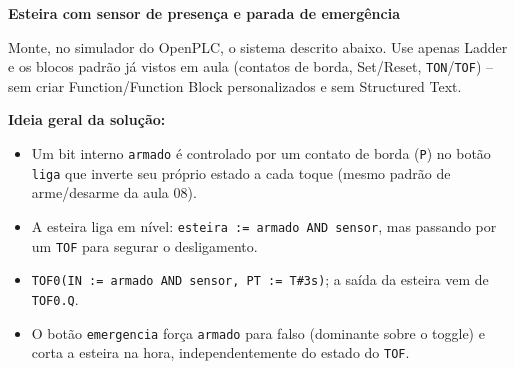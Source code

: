 \question[20] \textbf{Esteira com sensor de presença e parada de emergência}

Monte, no simulador do OpenPLC, o sistema descrito abaixo. Use apenas Ladder e os blocos padrão já vistos em aula (contatos de borda, Set/Reset, \texttt{TON}/\texttt{TOF}) -- sem criar Function/Function Block personalizados e sem Structured Text.


\begin{solution}
\textbf{Ideia geral da solução:}
\begin{itemize}
  \item Um bit interno \texttt{armado} é controlado por um contato de borda (\texttt{P}) no botão \texttt{liga} que inverte seu próprio estado a cada toque (mesmo padrão de arme/desarme da aula 08).
  \item A esteira liga em nível: \texttt{esteira := armado AND sensor}, mas passando por um \texttt{TOF} para segurar o desligamento.
  \item \texttt{TOF0(IN := armado AND sensor, PT := T\#3s)}; a saída da esteira vem de \texttt{TOF0.Q}.
  \item O botão \texttt{emergencia} força \texttt{armado} para falso (dominante sobre o toggle) e corta a esteira na hora, independentemente do estado do \texttt{TOF}.
\end{itemize}
\end{solution}
